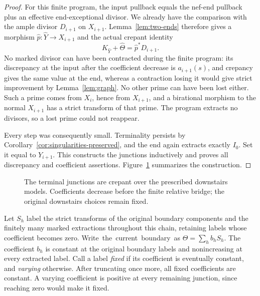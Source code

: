 \begin{proof}
For this finite program, the input pullback equals the nef-end pullback plus an effective end-exceptional divisor. We already have the comparison with the ample divisor $D_{i+1}$ on $X_{i+1}$. Lemma~\ref{lem:two-ends} therefore gives a morphism
$\widehat p:\widehat Y\to X_{i+1}$ and the actual crepant identity
\[
 K_{\widehat Y}+\widehat\Theta=\widehat p^*D_{i+1}.
\]
No marked divisor can have been contracted during the finite program: its discrepancy at the input after the coefficient decrease is $a_{i+1}(s)$, and crepancy gives the same value at the end, whereas a contraction losing it would give strict improvement by Lemma~\ref{lem:graph}. No other prime can have been lost either. Such a prime comes from $X_i$, hence from $X_{i+1}$, and a birational morphism to the normal $X_{i+1}$ has a strict transform of that prime. The program extracts no divisors, so a lost prime could not reappear.

Every step was consequently small. Terminality persists by Corollary~\ref{cor:singularities-preserved}, and the end again extracts exactly $I_0$. Set it equal to $Y_{i+1}$. This constructs the junctions inductively and proves all discrepancy and coefficient assertions. Figure~\ref{fig:terminal-bridge} summarizes the construction.
\end{proof}

\begin{figure}[ht]
\centering
{}
\caption{The terminal junctions are crepant over the prescribed downstairs models. Coefficients decrease before the finite relative bridge; the original downstairs choices remain fixed.}
\label{fig:terminal-bridge}
\end{figure}

Let $S_h$ label the strict transforms of the original boundary components and the finitely many marked extractions throughout this chain, retaining labels whose coefficient becomes zero. \mbox{Write the current boundary as}
$\Theta=\sum_h b_hS_h$. The coefficient $b_h$ is constant at the original boundary labels and nonincreasing at every extracted label. Call a label \emph{fixed} if its coefficient is eventually constant, and \emph{varying} otherwise. After truncating once more, all fixed coefficients are constant. A varying coefficient is positive at every remaining junction, since reaching zero would make it fixed.

